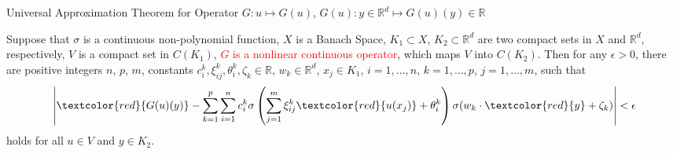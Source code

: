 \documentclass{beamer}
\begin{document}
\begin{frame}{Universal Approximation Theorem for Operator}
$G: u \mapsto G(u)$, $G(u): y \in \mathbb{R}^d \mapsto G(u)(y) \in \mathbb{R}$
\begin{theorem}
Suppose that $\sigma$ is a continuous non-polynomial function, $X$ is a Banach Space, $K_1 \subset X$, $K_2 \subset \mathbb{R}^d$ are two compact sets in $X$ and $\mathbb{R}^d$, respectively, $V$ is a compact set in $C(K_1)$, \textcolor{red}{$G$ is a nonlinear continuous operator}, which maps $V$ into $C(K_2)$. Then for any $\epsilon>0$, there are positive integers $n$, $p$, $m$, constants $c_i^k, \xi_{ij}^k, \theta_i^k, \zeta_k \in \mathbb{R}$, $w_k \in \mathbb{R}^d$, $x_j \in K_1$, $i=1,\dots,n$, $k=1,\dots,p$, $j=1,\dots,m$, such that
\begin{equation*}\label{eq:thm}
\left|\textcolor{red}{G(u)(y)} - \sum_{k=1}^p
\sum_{i=1}^n c_i^k \sigma\left(\sum_{j=1}^m \xi_{ij}^k \textcolor{red}{u(x_j)}+\theta_i^k\right)
\sigma(w_k \cdot \textcolor{red}{y}+\zeta_k)
\right|<\epsilon  
\end{equation*}
holds for all $u \in V$ and $y \in K_2$.
\end{theorem}
\end{frame}

\end{document}

